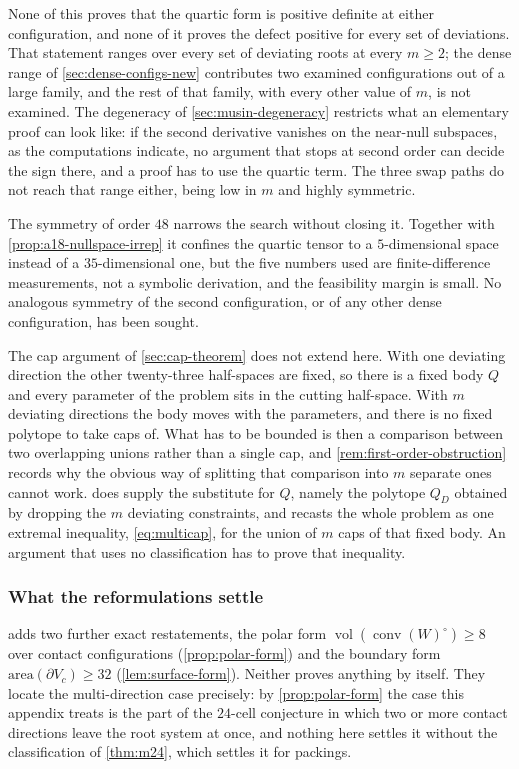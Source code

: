 \documentclass[11pt,reqno]{amsart}
\renewcommand{\_}{\origunderscore\allowbreak}
\numberwithin{equation}{section}
\theoremstyle{plain}
\theoremstyle{definition}
\theoremstyle{remark}
\DeclareMathOperator{\vol}{vol}
\DeclareMathOperator{\conv}{conv}
\begin{document}
None of this proves that the quartic form is positive definite at
either configuration, and none of it proves the defect positive for
every set of deviations. That statement ranges over every set of
deviating roots at every $m\ge2$; the dense range of
\cref{sec:dense-configs-new} contributes two examined configurations
out of a large family, and the rest of that family, with every
other value of $m$, is not examined. The degeneracy of
\cref{sec:musin-degeneracy} restricts what an elementary proof can look
like: if the second derivative vanishes on the near-null subspaces, as
the computations indicate, no argument that stops at second order can
decide the sign there, and a proof has to use the quartic term. The
three swap paths do not reach that range either, being low in $m$ and
highly symmetric.

The symmetry of order $48$ narrows the search without closing it.
Together with \cref{prop:a18-nullspace-irrep} it confines the quartic
tensor to a $5$-dimensional space instead of a $35$-dimensional one, but
the five numbers used are finite-difference measurements, not a
symbolic derivation, and the feasibility margin is small. No analogous
symmetry of the second configuration, or of any other dense
configuration, has been sought.

The cap argument of \cref{sec:cap-theorem} does not extend here. With one deviating
direction the other twenty-three half-spaces are fixed, so there is a
fixed body $Q$ and every parameter of the problem sits in the cutting
half-space. With $m$ deviating directions the body moves with the
parameters, and there is no fixed polytope to take caps of. What has to
be bounded is then a comparison between two overlapping unions rather
than a single cap, and \cref{rem:first-order-obstruction} records why
the obvious way of splitting that comparison into $m$ separate ones
cannot work.  does supply the substitute for $Q$, namely the
polytope $Q_D$ obtained by dropping the $m$ deviating constraints, and
recasts the whole problem as one extremal inequality,
\eqref{eq:multicap}, for the union of $m$ caps of that fixed body. An argument
that uses no classification has to prove that inequality.

\subsubsection{What the reformulations settle}

 adds two further exact restatements, the polar
form $\vol(\conv(W)^{\circ})\ge8$ over contact configurations
(\cref{prop:polar-form}) and the boundary form
$\mathrm{area}(\partial V_c)\ge32$ (\cref{lem:surface-form}). Neither
proves anything by itself. They locate the multi-direction case
precisely: by \cref{prop:polar-form} the case this appendix treats is
the part of the $24$-cell conjecture in which two or more contact
directions leave the root system at once, and nothing here settles it
without the classification of \cref{thm:m24}, which settles it for
packings.
\end{document}
